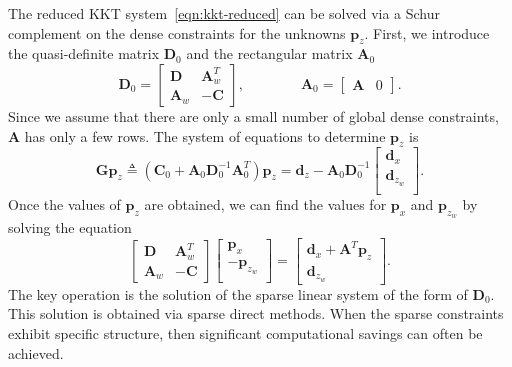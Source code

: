 \documentclass[12pt]{article}
\newcommand{\mb}{\mathbf}
\begin{document}
The reduced KKT system~\eqref{eqn:kkt-reduced} can be solved via a Schur complement on the dense constraints for the unknowns $\mb{p}_{z}$.
First, we introduce the quasi-definite matrix $\mb{D}_{0}$ and the rectangular matrix $\mb{A}_{0}$
\begin{equation*}
	\mb{D}_{0} =
	\begin{bmatrix}
	\mb{D} & \mb{A}_{w}^{T} \\
	\mb{A}_{w} & - \mb{C}
	\end{bmatrix},
	\qquad\qquad
	\mb{A}_{0} = \begin{bmatrix} \mb{A} & 0 \end{bmatrix}.
\end{equation*}
Since we assume that there are only a small number of global dense constraints, $\mb{A}$ has only a few rows.
%
The system of equations to determine $\mb{p}_{z}$ is
%
\begin{equation*}
	\mb{G} \mb{p}_{z} \triangleq \left( \mb{C}_{0} + \mb{A}_{0} \mb{D}_{0}^{-1} \mb{A}_{0}^{T} \right)  \mb{p}_{z} = \mb{d}_{z} - \mb{A}_{0} \mb{D}_{0}^{-1} \begin{bmatrix}
	\mb{d}_{x} \\
	\mb{d}_{z_{w}} \\
	\end{bmatrix}.
\end{equation*}
Once the values of $\mb{p}_{z}$ are obtained, we can find the values for $\mb{p}_{x}$ and $\mb{p}_{z_{w}}$ by solving the equation
%
\begin{equation*}
	\begin{bmatrix}
	\mb{D} & \mb{A}_{w}^{T} \\
	\mb{A}_{w} & - \mb{C}
	\end{bmatrix}
	\begin{bmatrix}
		\mb{p}_{x} \\
		-\mb{p}_{z_{w}} \\
	\end{bmatrix} =
	\begin{bmatrix}
	\mb{d}_{x} + \mb{A}^{T} \mb{p}_{z} \\
	\mb{d}_{z_{w}}
	\end{bmatrix}.
\end{equation*}
%
The key operation is the solution of the sparse linear system of the form of $\mb{D}_{0}$.
This solution is obtained via sparse direct methods.
When the sparse constraints exhibit specific structure, then significant computational savings can often be achieved.
\end{document}
